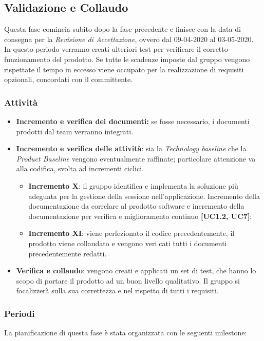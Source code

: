 \subsection{Validazione e Collaudo}
Questa fase comincia subito dopo la fase precedente e finisce con la data di consegna per la \textit{Revisione di Accettazione}, ovvero dal 09-04-2020 al 03-05-2020.\\
In questo periodo verranno creati ulteriori test per verificare il corretto funzionamento del prodotto. Se tutte le scadenze imposte dal gruppo vengono rispettate il tempo in eccesso viene occupato per la realizzazione di requisiti opzionali, concordati con il committente. 
\subsubsection{Attività}
\begin{itemize}
\item \textbf{Incremento e verifica dei documenti:} se fosse necessario, i documenti prodotti dal team verranno integrati.

 \item \textbf{Incremento e verifica delle attività}: sia la \textit{Technology baseline} che la \textit{Product Baseline} vengono eventualmente raffinate; particolare attenzione va alla codifica, svolta ad incrementi ciclici.
 \begin{itemize}
 \item \textbf{Incremento X}: il gruppo identifica e implementa la soluzione più adeguata per la gestione della sessione nell'applicazione. Incremento della documentazione da correlare al prodotto software e incremento della documentazione per verifica e miglioramento continuo \textbf{[UC1.2, UC7]};
\item \textbf{Incremento XI}: viene perfezionato il codice precedentemente, il prodotto viene collaudato e vengono vericati tutti i documenti precedentemente redatti. 
 \end{itemize}

 \item \textbf{Verifica e collaudo}: vengono creati e applicati un set di test, che hanno lo scopo di portare il prodotto ad un buon livello qualitativo. Il gruppo si focalizzerà sulla sua correttezza e nel rispetto di tutti i requisiti.
\end{itemize}

\subsubsection{Periodi}
La pianificazione di questa fase è stata organizzata con le seguenti milestone:

